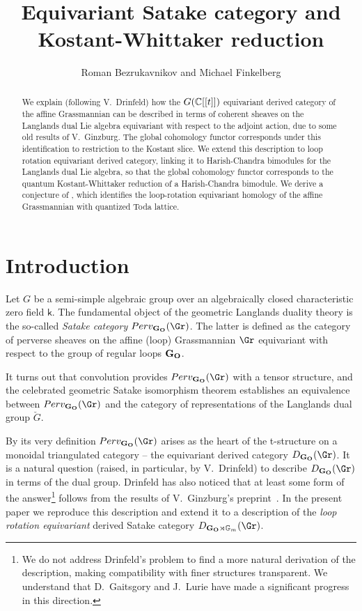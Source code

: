 \documentclass[11pt]{amsart}
\author{Roman Bezrukavnikov and Michael Finkelberg}
\title{Equivariant Satake category and Kostant-Whittaker reduction}
\theoremstyle{definition}
\theoremstyle{remark}
\theoremstyle{remark}
\newcommand{\<}{\langle}
\renewcommand{\>}{\rangle}
\newcommand{\LG}{{\check{G}}}
\newcommand{\Ce}{{\Bbb C}}
\newcommand{\GO}{{\bf G_O}}
\newcommand{\Gm}{{{\mathbb G}_m}}
\newcommand{\kk}{\mathsf k}
\newcommand{\PerSatak}{{Perv_{\GO}(\Gr)}}
\newcommand{\DerSatak}{{D_{\GO\rtimes\Gm}(\Gr)}}
\newcommand{\DerSatakneloop}{{D_{\GO}(\Gr)}}
\begin{document}
\maketitle
\tableofcontents

\begin{abstract}
We explain (following V.~Drinfeld)
how the $G(\Ce[[t]])$ equivariant derived category
of the affine Grassmannian can be described in terms
of coherent sheaves on the Langlands dual Lie algebra equivariant
with respect to the adjoint action, due to some old results of V.~Ginzburg.
The global cohomology functor corresponds under this identification to restriction
to the Kostant slice.
We extend this description to loop rotation equivariant
derived category, linking it to Harish-Chandra bimodules
for the Langlands dual Lie algebra, so that the global cohomology functor corresponds to
the quantum Kostant-Whittaker reduction of a Harish-Chandra bimodule.
We derive a conjecture of \cite{BFM}, which identifies
the loop-rotation equivariant homology of the affine Grassmannian
with quantized Toda lattice.
\end{abstract}

\section{Introduction}
Let $G$ be a semi-simple algebraic group over an algebraically closed 
characteristic zero field $\kk$. The fundamental object of the 
geometric Langlands duality theory is the so-called {\em Satake 
category $\PerSatak$}. The latter is defined as the category of perverse
sheaves on the affine (loop) Grassmannian $\Gr$
equivariant with respect to the group of regular loops $\GO$.

It turns out that convolution provides $\PerSatak$ with a tensor structure,
and the celebrated geometric Satake isomorphism theorem establishes an
equivalence between 
$\PerSatak$ and the category of representations
of the Langlands dual group $\LG$.


By its very definition $\PerSatak$ arises as the heart of the t-structure
on a monoidal triangulated category -- the equivariant derived category
$\DerSatakneloop$. It is a natural question (raised, in particular,
 by V.~Drinfeld) 
to describe $\DerSatakneloop$
 in terms of the dual group. Drinfeld has also noticed
that at least some form of the answer\footnote{We do not address 
Drinfeld's problem to find a more natural derivation of the description,
making compatibility with finer structures transparent. We understand
that D.~Gaitsgory and J.~Lurie have made a significant progress in this
 direction.}
follows from the results of V.~Ginzburg's preprint~\cite{G}. 
In the present paper we reproduce this description and extend
it to a description of the {\em loop rotation equivariant} derived Satake
category $\DerSatak$.
\end{document}
